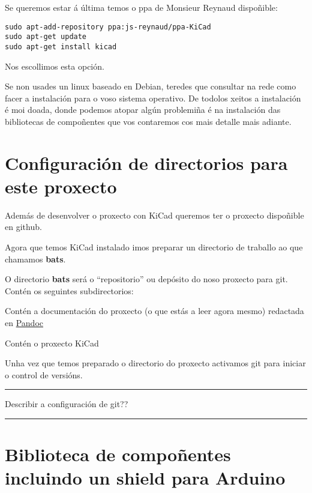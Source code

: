 \documentclass[12pt,galician,]{article}
\providecommand{\tightlist}{%
  \setlength{\itemsep}{0pt}\setlength{\parskip}{0pt}}
\begin{document}
Se queremos estar á última temos o ppa de Monsieur Reynaud dispoñible:

\begin{verbatim}
sudo apt-add-repository ppa:js-reynaud/ppa-KiCad
sudo apt-get update
sudo apt-get install kicad
\end{verbatim}

Nos escollimos esta opción.

Se non usades un linux baseado en Debian, teredes que consultar na rede
como facer a instalación para o voso sistema operativo. De todolos
xeitos a instalación é moi doada, donde podemos atopar algún problemiña
é na instalación das bibliotecas de compoñentes que vos contaremos cos
mais detalle mais adiante.

\section{Configuración de directorios para este
proxecto}\label{configuraciuxf3n-de-directorios-para-este-proxecto}

Además de desenvolver o proxecto con KiCad queremos ter o proxecto
dispoñible en github.

Agora que temos KiCad instalado imos preparar un directorio de traballo
ao que chamamos \textbf{bats}.

O directorio \textbf{bats} será o ``repositorio'' ou depósito do noso
proxecto para git. Contén os seguintes subdirectorios:

\begin{description}
\tightlist
\item[doc]
Contén a documentación do proxecto (o que estás a leer agora mesmo)
redactada en \href{http://pandoc.org/}{Pandoc}
\item[kicad]
Contén o proxecto KiCad
\end{description}

Unha vez que temos preparado o directorio do proxecto activamos git para
iniciar o control de versións.

\begin{center}\rule{0.5\linewidth}{\linethickness}\end{center}

Describir a configuración de git??

\begin{center}\rule{0.5\linewidth}{\linethickness}\end{center}

\section{Biblioteca de compoñentes incluindo un shield para
Arduino}\label{biblioteca-de-compouxf1entes-incluindo-un-shield-para-arduino}
\end{document}
